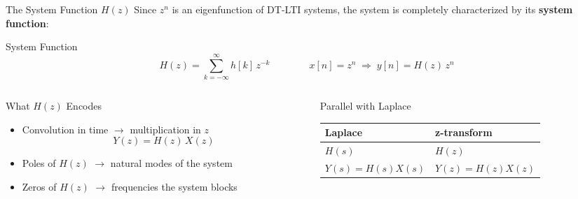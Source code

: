 \begin{frame}[t]{The System Function \texorpdfstring{$H(z)$}{H(z)}}
  \small
  Since $z^n$ is an eigenfunction of DT-LTI systems, the system is completely characterized by its \textbf{system function}:
  \begin{conceptbox}{System Function}
    \vspace{-0.2cm}
    \[
      H(z) = \sum_{k=-\infty}^{\infty} h[k]\,z^{-k}
      \qquad\qquad
      x[n] = z^n \;\Longrightarrow\; y[n] = H(z)\,z^n
    \]
    \vspace{-0.2cm}
  \end{conceptbox}

  \vspace{0.15cm}
  \begin{columns}[T]
    \begin{column}{0.48\textwidth}
      \begin{insightbox}{What $H(z)$ Encodes}
        \footnotesize
      \begin{itemize}\setlength\itemsep{0pt}
          \item Convolution in time $\longrightarrow$ multiplication in $z$
            \[ Y(z) = H(z)\,X(z) \]
          \item Poles of $H(z)$ $\longrightarrow$ natural modes of the system
          \item Zeros of $H(z)$ $\longrightarrow$ frequencies the system blocks
        \end{itemize}
      \end{insightbox}
    \end{column}
    \begin{column}{0.48\textwidth}
      \begin{insightbox}{Parallel with Laplace}
        \footnotesize
        \renewcommand{\arraystretch}{1.3}
        \begin{tabular}{@{}l@{\quad}l@{}}
          Laplace & z-transform \\
          \midrule
          $H(s)$ & $H(z)$ \\
          $Y(s)=H(s)X(s)$ & $Y(z)=H(z)X(z)$
        \end{tabular}
      \end{insightbox}
    \end{column}
  \end{columns}
\end{frame}

